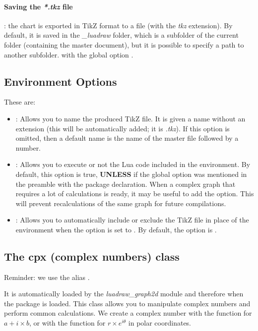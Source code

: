 \paragraph{Saving the \emph{*.tkz} file}: the chart is exported in TikZ format to a file (with the \emph{tkz} extension). By default, it is saved in the \emph{\_luadraw} folder, which is a subfolder of the current folder (containing the master document), but it is possible to specify a path to another subfolder. with the global option .

\subsection{\luadrawenv Environment Options}

These are:
\begin{itemize}
    \item {}: Allows you to name the produced TikZ file. It is given a name without an extension (this will be automatically added; it is \emph{.tkz}). If this option is omitted, then a default name is the name of the master file followed by a number.

    \item {}: Allows you to execute or not the Lua code included in the environment. By default, this option is true, \textbf{UNLESS} if the global option  was mentioned in the preamble with the package declaration. When a complex graph that requires a lot of calculations is ready, it may be useful to add the  option. This will prevent recalculations of the same graph for future compilations.

    \item {}: Allows you to automatically include or exclude the TikZ file in place of the \luadrawenv environment when the  option is set to \false. By default, the  option is \true.

\end{itemize}

\subsection{The cpx (complex numbers) class}

Reminder: we use the alias .

It is automatically loaded by the \emph{luadraw\_graph2d} module and therefore when the \luadrawenv package is loaded. This class allows you to manipulate complex numbers and perform common calculations. We create a complex number with the function  for \(a + i\times b\), or with the function  for \(r\times e^{i\theta}\) in polar coordinates.

